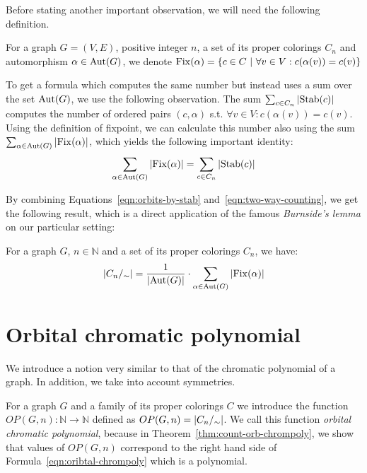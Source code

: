 Before stating another important observation, we will need the following definition.

\begin{defn}[fixpoint]
    For a graph $G = (V,E)$, positive integer $n$, a set of its proper colorings $C_n$ and automorphism $\alpha \in \operatorname{Aut}(G)$, we denote $\operatorname{Fix}(\alpha)= \{ c \in C \ | \ \forall v \in V : c(\alpha(v)) = c(v) \}$
\end{defn}

To get a formula which computes the same number but instead uses a sum over the set $\operatorname{Aut}(G)$, we use the following observation. The sum $\sum_{c \in C_n} \left|{\operatorname{Stab}(c)}\right|$ computes the number of ordered pairs $(c,\alpha)$ s.t. $\forall v \in V : c(\alpha(v)) = c(v)$. Using the definition of fixpoint, we can calculate this number also using the sum $\sum_{\alpha \in \operatorname{Aut}(G)} \left|{\operatorname{Fix}(\alpha)}\right|$, which yields the following important identity:
\begin{equation}\label{eqn:two-way-counting}
    \sum_{\alpha \in \operatorname{Aut}(G)} \left|{\operatorname{Fix}(\alpha)}\right| = \sum_{c \in C_n}\left|{\operatorname{Stab}(c)}\right|    
\end{equation}

By combining Equations~\ref{eqn:orbits-by-stab} and~\ref{eqn:two-way-counting}, we get the following result, which is a direct application of the famous \textit{Burnside's lemma} on our particular setting:

\begin{thm} \label{thm:burnside}
    For a graph $G$, $n \in \mathbb{N}$ and a set of its proper colorings $C_n$, we have: $$\left|{C_n/_\sim}\right| = \frac{1}{\left|{\operatorname{Aut}(G)}\right|}\cdot \sum_{\alpha \in \operatorname{Aut}(G)}\left|{\operatorname{Fix}(\alpha)}\right|$$
\end{thm}

\section{Orbital chromatic polynomial}

We introduce a notion very similar to that of the chromatic polynomial of a graph. In addition, we take into account symmetries.


\begin{defn}
    For a graph $G$ and a family of its proper colorings $C$ we introduce the function $OP(G,n): \mathbb{N}\to \mathbb{N}$ defined as $
    OP(G,n)=\left|{C_n/_\sim}\right|$. We call this function \emph{orbital chromatic polynomial}, because 
    in Theorem~\ref{thm:count-orb-chrompoly}, we show that values of $OP(G,n)$ 
    correspond to the right hand side of Formula~\ref{eqn:oribtal-chrompoly} which is a polynomial.
\end{defn}

